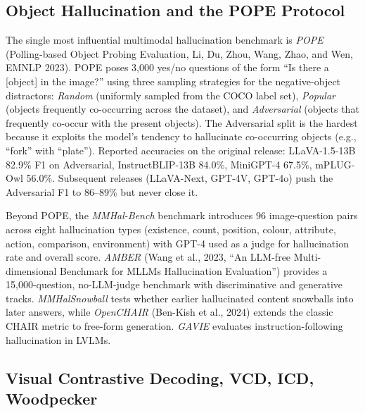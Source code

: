 \documentclass{article}
\begin{document}
\subsection{Object Hallucination and the POPE Protocol}\label{object-hallucination-and-the-pope-protocol}

The single most influential multimodal hallucination benchmark is \emph{POPE} (Polling-based Object Probing Evaluation, Li, Du, Zhou, Wang, Zhao, and Wen, EMNLP 2023). POPE poses 3,000 yes/no questions of the form ``Is there a {[}object{]} in the image?'' using three sampling strategies for the negative-object distractors: \emph{Random} (uniformly sampled from the COCO label set), \emph{Popular} (objects frequently co-occurring across the dataset), and \emph{Adversarial} (objects that frequently co-occur with the present objects). The Adversarial split is the hardest because it exploits the model's tendency to hallucinate co-occurring objects (e.g., ``fork'' with ``plate''). Reported accuracies on the original release: LLaVA-1.5-13B 82.9\% F1 on Adversarial, InstructBLIP-13B 84.0\%, MiniGPT-4 67.5\%, mPLUG-Owl 56.0\%. Subsequent releases (LLaVA-Next, GPT-4V, GPT-4o) push the Adversarial F1 to 86--89\% but never close it.

Beyond POPE, the \emph{MMHal-Bench} benchmark \citep{sun2023aligninglargemulti} introduces 96 image-question pairs across eight hallucination types (existence, count, position, colour, attribute, action, comparison, environment) with GPT-4 used as a judge for hallucination rate and overall score. \emph{AMBER} (Wang et al., 2023, ``An LLM-free Multi-dimensional Benchmark for MLLMs Hallucination Evaluation'') provides a 15,000-question, no-LLM-judge benchmark with discriminative and generative tracks. \emph{MMHalSnowball} \citep{lin2024towardstrustworthy} tests whether earlier hallucinated content snowballs into later answers, while \emph{OpenCHAIR} (Ben-Kish et al., 2024) extends the classic CHAIR metric to free-form generation. \emph{GAVIE} \citep{liu2023gevalnlgevaluation} evaluates instruction-following hallucination in LVLMs.

\subsection{Visual Contrastive Decoding, VCD, ICD, Woodpecker}\label{visual-contrastive-decoding-vcd-icd-woodpecker}
\end{document}
